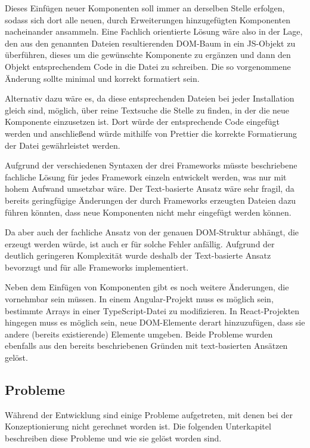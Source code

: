 Dieses Einfügen neuer Komponenten soll immer an derselben Stelle erfolgen, sodass sich dort alle neuen, durch Erweiterungen hinzugefügten Komponenten nacheinander ansammeln. Eine Fachlich orientierte Lösung wäre also in der Lage, den aus den genannten Dateien resultierenden \gls{DOM}-Baum in ein \gls{JS}-Objekt zu überführen, dieses um die gewünschte Komponente zu ergänzen und dann den Objekt entsprechendem Code in die Datei zu schreiben. Die so vorgenommene Änderung sollte minimal und korrekt formatiert sein.

Alternativ dazu wäre es, da diese entsprechenden Dateien bei jeder Installation gleich sind, möglich, über reine Textsuche die Stelle zu finden, in der die neue Komponente einzusetzen ist. Dort würde der entsprechende Code eingefügt werden und anschließend würde mithilfe von Prettier die korrekte Formatierung der Datei gewährleistet werden.

Aufgrund der verschiedenen Syntaxen der drei Frameworks müsste beschriebene fachliche Lösung für jedes Framework einzeln entwickelt werden, was nur mit hohem Aufwand umsetzbar wäre. Der Text-basierte Ansatz wäre sehr fragil, da bereits geringfügige Änderungen der durch Frameworks erzeugten Dateien dazu führen könnten, dass neue Komponenten nicht mehr eingefügt werden können.

Da aber auch der fachliche Ansatz von der genauen \gls{DOM}-Struktur abhängt, die erzeugt werden würde, ist auch er für solche Fehler anfällig. Aufgrund der deutlich geringeren Komplexität wurde deshalb der Text-basierte Ansatz bevorzugt und für alle Frameworks implementiert.

Neben dem Einfügen von Komponenten gibt es noch weitere Änderungen, die vornehmbar sein müssen. In einem Angular-Projekt muss es möglich sein, bestimmte Arrays in einer TypeScript-Datei zu modifizieren. In React-Projekten hingegen muss es möglich sein, neue \gls{DOM}-Elemente derart hinzuzufügen, dass sie andere (bereits existierende) Elemente umgeben. Beide Probleme wurden ebenfalls aus den bereits beschriebenen Gründen mit text-basierten Ansätzen gelöst.

\subsection{Probleme}
Während der Entwicklung sind einige Probleme aufgetreten, mit denen bei der Konzeptionierung nicht gerechnet worden ist. Die folgenden Unterkapitel beschreiben diese Probleme und wie sie gelöst worden sind.

